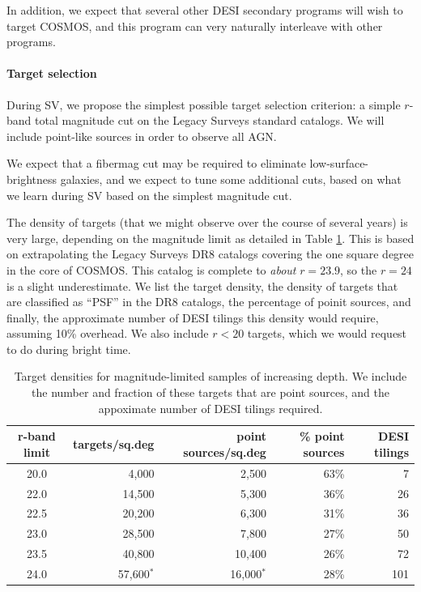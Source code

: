 \documentclass{aastex63}
\begin{document}
In addition, we expect that several other DESI secondary programs will
wish to target COSMOS, and this program can very naturally interleave
with other programs.

\paragraph{Target selection}
During SV, we propose the simplest possible target selection
criterion: a simple $r$-band total magnitude cut on the Legacy Surveys
standard catalogs.  We will include point-like sources in order to
observe all AGN.

We expect that a fibermag cut may be required to eliminate
low-surface-brightness galaxies, and we expect to tune some additional
cuts, based on what we learn during SV based on the simplest magnitude
cut.

The density of targets (that we might observe over the course of
several years) is very large, depending on the magnitude limit as
detailed in Table \ref{tab:targets}.  This is based on extrapolating
the Legacy Surveys DR8 catalogs covering the one square degree in the
core of COSMOS.  This catalog is complete to \emph{about} $r=23.9$, so
the $r=24$ is a slight underestimate.  We list the target density, the
density of targets that are classified as ``PSF'' in the DR8 catalogs,
the percentage of poinit sources, and finally, the approximate number
of DESI tilings this density would require, assuming 10\% overhead.
We also include $r<20$ targets, which we would request to do during
bright time.

\begin{table}
\begin{tabular}{|c|r|r|r|r|}
  \hline
  \textbf{r-band limit} & \textbf{targets/sq.deg} & \textbf{point sources/sq.deg} & \textbf{\% point sources} & \textbf{DESI tilings} \\
  \hline
  20.0 & 4,000  & 2,500 & 63\% & 7 \\
  22.0 & 14,500 & 5,300 & 36\% & 26 \\
  22.5 & 20,200 & 6,300 & 31\% & 36 \\
  23.0 & 28,500 & 7,800 & 27\% & 50 \\
  23.5 & 40,800 & 10,400 & 26\% & 72 \\
  24.0 & 57,600$^\ast$ & 16,000$^\ast$ & 28\% & 101 \\
  \hline
\end{tabular}
\caption{Target densities for magnitude-limited samples of increasing depth.
  We include the number and fraction of these targets that are point sources,
  and the appoximate number of DESI tilings required. \label{tab:targets}}
\end{table}
\end{document}
